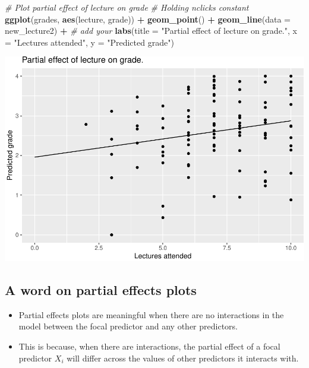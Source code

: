\documentclass[
]{article}
\newenvironment{Shaded}{\begin{snugshade}}{\end{snugshade}}
\newcommand{\AttributeTok}[1]{\textcolor[rgb]{0.13,0.29,0.53}{#1}}
\newcommand{\CommentTok}[1]{\textcolor[rgb]{0.56,0.35,0.01}{\textit{#1}}}
\newcommand{\FunctionTok}[1]{\textcolor[rgb]{0.13,0.29,0.53}{\textbf{#1}}}
\newcommand{\NormalTok}[1]{#1}
\newcommand{\SpecialCharTok}[1]{\textcolor[rgb]{0.81,0.36,0.00}{\textbf{#1}}}
\newcommand{\StringTok}[1]{\textcolor[rgb]{0.31,0.60,0.02}{#1}}
\providecommand{\tightlist}{%
  \setlength{\itemsep}{0pt}\setlength{\parskip}{0pt}}
\begin{document}
\begin{Shaded}
\begin{Highlighting}[]
\CommentTok{\# Plot partial effect of lecture on grade}
\CommentTok{\# Holding \textasciigrave{}nclicks\textasciigrave{} constant}
\FunctionTok{ggplot}\NormalTok{(grades, }\FunctionTok{aes}\NormalTok{(lecture, grade)) }\SpecialCharTok{+} 
  \FunctionTok{geom\_point}\NormalTok{() }\SpecialCharTok{+}
  \FunctionTok{geom\_line}\NormalTok{(}\AttributeTok{data =}\NormalTok{ new\_lecture2) }\SpecialCharTok{+} \CommentTok{\# add your }
  \FunctionTok{labs}\NormalTok{(}\AttributeTok{title =} \StringTok{"Partial effect of lecture on grade."}\NormalTok{, }
       \AttributeTok{x =} \StringTok{"Lectures attended"}\NormalTok{,}
       \AttributeTok{y =} \StringTok{"Predicted grade"}\NormalTok{)}
\end{Highlighting}
\end{Shaded}

\includegraphics{L9_Multiple_regression_pdf_files/figure-latex/unnamed-chunk-10-1.pdf}

\hypertarget{a-word-on-partial-effects-plots}{%
\subsection{A word on partial effects
plots}\label{a-word-on-partial-effects-plots}}

\begin{itemize}
\tightlist
\item
  Partial effects plots are meaningful when there are no interactions in
  the model between the focal predictor and any other predictors.
\item
  This is because, when there are interactions, the partial effect of a
  focal predictor \(X_i\) will differ across the values of other
  predictors it interacts with.
\end{itemize}
\end{document}
